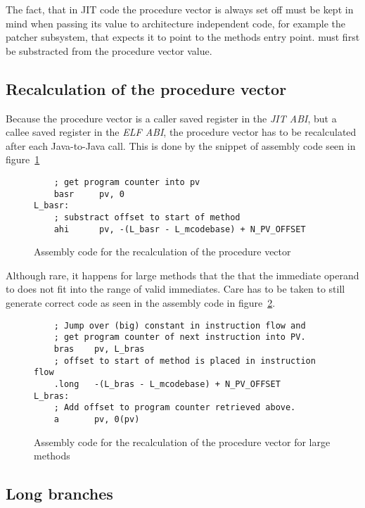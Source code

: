 The fact, that in JIT code the procedure vector is always set off must be kept in mind when passing its value to architecture independent code, for example the patcher subsystem, that expects it to point to the methods entry point.  must first be substracted from the procedure vector value.

\subsection{Recalculation of the procedure vector}

Because the procedure vector is a caller saved register in the \emph{JIT ABI}, but a callee saved register in the \emph{ELF ABI}, the procedure vector has to be recalculated after each Java-to-Java call. This is done by the snippet of assembly code seen in figure~\ref{s390:fig:pvrestore1}

\begin{figure}[H]
\begin{verbatim}
    ; get program counter into pv
    basr     pv, 0 
L_basr:
    ; substract offset to start of method
    ahi      pv, -(L_basr - L_mcodebase) + N_PV_OFFSET
\end{verbatim}
\caption{Assembly code for the recalculation of the procedure vector}
\label{s390:fig:pvrestore1}
\end{figure}

Although rare, it happens for large methods that the that the immediate operand to  does not fit into the range of valid immediates. Care has to be taken to still generate correct code as seen in the assembly code in figure~\ref{s390:fig:pvrestore2}.

\begin{figure}[H]
\begin{verbatim}
    ; Jump over (big) constant in instruction flow and
    ; get program counter of next instruction into PV.
    bras    pv, L_bras
    ; offset to start of method is placed in instruction flow
    .long   -(L_bras - L_mcodebase) + N_PV_OFFSET
L_bras:
    ; Add offset to program counter retrieved above.
    a       pv, 0(pv)
\end{verbatim}
\caption{Assembly code for the recalculation of the procedure vector for large methods}
\label{s390:fig:pvrestore2}
\end{figure}

\subsection{Long branches}

